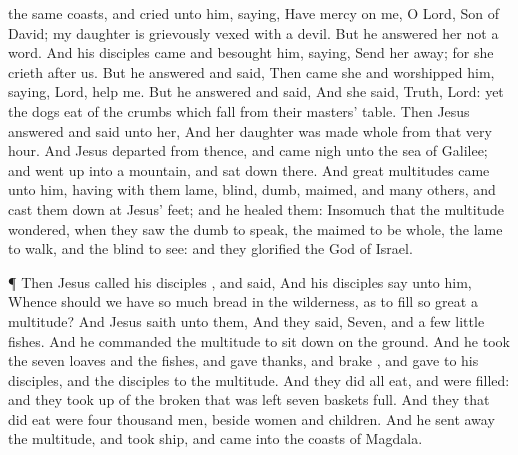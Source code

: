 {the
same
coasts, and
cried unto
him,
saying, Have
mercy on
me, O
Lord,
{}
Son of
David;
my
daughter
is
grievously vexed with a
devil.
But he
answered
her
not a
word.
And
his
disciples
came and
besought
him,
saying,
Send
her
away;
for she
crieth
after
us.
But he
answered and
said,
{}
Then came
she and
worshipped
him,
saying,
Lord,
help
me.
But he
answered and
said,
{}
And she
said,
Truth,
Lord:
yet the
dogs
eat
of the
crumbs which
fall
from
their
masters’
table.
Then
Jesus
answered and
said unto
her,
{}
And
her
daughter was made
whole
from that
very
hour.
And
Jesus
departed from
thence, and
came
nigh unto the
sea of
Galilee;
and went
up
into a
mountain, and sat
down
there.
And
great
multitudes came
unto
him,
having
with
them
{}
lame,
blind,
dumb,
maimed,
and
many
others,
and
cast
them
down
at
Jesus’
feet;
and he
healed
them:
Insomuch
that the
multitude
wondered, when they
saw the
dumb to
speak, the
maimed to be
whole, the
lame to
walk,
and the
blind to
see:
and they
glorified the
God of
Israel.
\par }{\PP {}¶
Then
Jesus
called
his
disciples
{}, and
said,
{}
And
his
disciples
say unto
him,
Whence should we
have so
much
bread
in the
wilderness,
as to
fill so
great a
multitude?
And
Jesus
saith unto
them,
{}
And they
said,
Seven,
and a
few little
fishes.
And he
commanded the
multitude to sit
down
on the
ground.
And he
took
the
seven
loaves
and the
fishes, and gave
thanks, and
brake
{},
and
gave
to
his
disciples,
and the
disciples to the
multitude.
And they
did
all
eat,
and were
filled:
and they took
up of the
broken
{} that was
left
seven
baskets
full.
And they that did
eat
were four
thousand
men,
beside
women
and
children.
And he sent
away the
multitude, and
took
ship,
and
came
into the
coasts of
Magdala.

}
